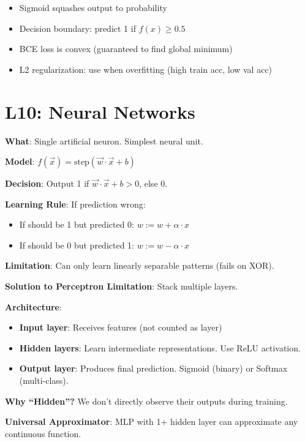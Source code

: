\documentclass[11pt,a4paper]{article}
\begin{document}
\begin{notebox}

\begin{itemize}[leftmargin=*,nosep]
\item Sigmoid squashes output to probability
\item Decision boundary: predict 1 if $f(x) \geq 0.5$
\item BCE loss is convex (guaranteed to find global minimum)
\item L2 regularization: use when overfitting (high train acc, low val acc)
\end{itemize}
\end{notebox}

\section{L10: Neural Networks}

\begin{definitionbox}[Perceptron]

\textbf{What}: Single artificial neuron. Simplest neural unit.

\textbf{Model}: $f(\vec{x}) = \text{step}(\vec{w} \cdot \vec{x} + b)$

\textbf{Decision}: Output 1 if $\vec{w} \cdot \vec{x} + b > 0$, else 0.

\textbf{Learning Rule}: If prediction wrong:
\begin{itemize}[leftmargin=*,nosep]
\item If should be 1 but predicted 0: $w := w + \alpha \cdot x$
\item If should be 0 but predicted 1: $w := w - \alpha \cdot x$
\end{itemize}

\textbf{Limitation}: Can only learn linearly separable patterns (fails on XOR).
\end{definitionbox}

\begin{definitionbox}

\textbf{Solution to Perceptron Limitation}: Stack multiple layers.

\textbf{Architecture}:
\begin{itemize}[leftmargin=*,nosep]
\item \textbf{Input layer}: Receives features (not counted as layer)
\item \textbf{Hidden layers}: Learn intermediate representations. Use ReLU activation.
\item \textbf{Output layer}: Produces final prediction. Sigmoid (binary) or Softmax (multi-class).
\end{itemize}

\textbf{Why ``Hidden''?} We don't directly observe their outputs during training.

\textbf{Universal Approximator}: MLP with 1+ hidden layer can approximate any continuous function.
\end{definitionbox}
\end{document}

